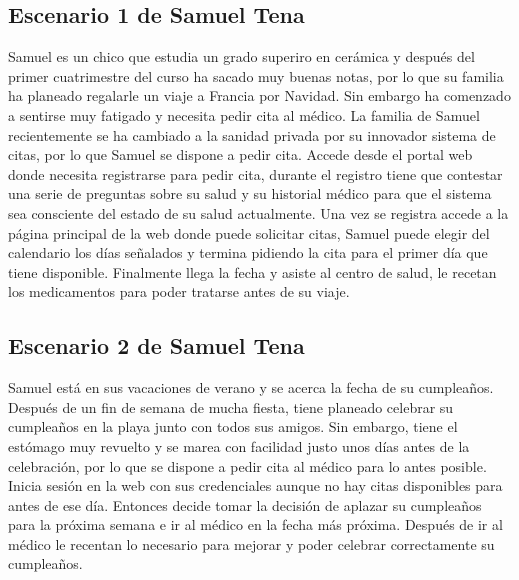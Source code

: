 \subsection{Escenario 1 de Samuel Tena} 
    Samuel es un chico que estudia un grado superiro en cerámica y después del primer
    cuatrimestre del curso ha sacado muy buenas notas, por lo que su familia ha planeado
    regalarle un viaje a Francia por Navidad. Sin embargo ha comenzado a sentirse muy fatigado
     y necesita pedir cita al médico. La familia de Samuel recientemente
    se ha cambiado a la sanidad privada por su innovador sistema de citas, por lo que Samuel se
    dispone a pedir cita. Accede desde el portal web donde necesita registrarse para pedir cita,
    durante el registro tiene que contestar una serie de preguntas sobre su salud y su historial
    médico para que el sistema sea consciente del estado de su salud actualmente.
    Una vez se registra accede a la página principal de la web donde puede solicitar citas, Samuel
    puede elegir del calendario los días señalados y termina pidiendo la cita para el primer día que
    tiene disponible. Finalmente llega la fecha y asiste al centro de salud, le recetan los
    medicamentos para poder tratarse antes de su viaje.


\subsection{Escenario 2 de Samuel Tena}
    Samuel está en sus vacaciones de verano y se acerca la fecha de su cumpleaños. 
    Después de un fin de semana de mucha fiesta, tiene planeado celebrar su cumpleaños 
    en la playa junto con todos sus amigos. Sin embargo, tiene el estómago muy revuelto 
    y se marea con facilidad justo unos días antes de la celebración, por lo que se dispone 
    a pedir cita al médico para lo antes posible. Inicia sesión en la web con sus credenciales 
    aunque no hay citas disponibles para antes de ese día. Entonces decide tomar la decisión 
    de aplazar su cumpleaños para la próxima semana e ir al médico en la fecha más próxima.
    Después de ir al médico le recentan lo necesario para mejorar y poder celebrar correctamente 
    su cumpleaños. 
    

